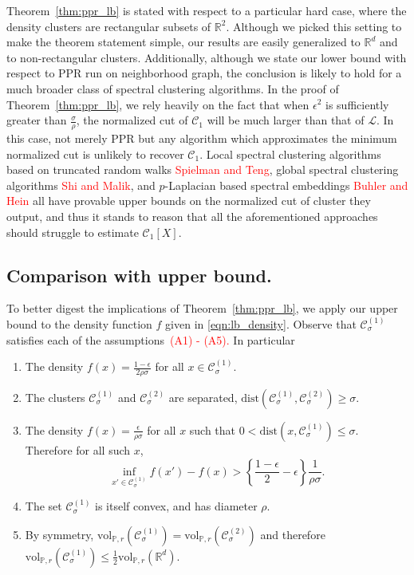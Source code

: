 \documentclass[11pt,twoside]{article}
\newcommand{\vol}{\mathrm{vol}}
\newcommand{\Reals}{\mathbb{R}}
\newcommand{\1}{\mathbf{1}}
\newcommand{\dist}{\mathrm{dist}}
\newcommand{\Xbf}{X}             %
\newcommand{\Pbb}{\mathbb{P}}
\newcommand{\Cset}{\mathcal{C}}
\newcommand{\Csig}{\Cset_{\sigma}}
\begin{document}
Theorem~\ref{thm:ppr_lb} is stated with respect to a particular hard case, where the density clusters are rectangular subsets of $\Reals^2$. Although we picked this setting to make the theorem statement simple, our results are easily generalized to $\Reals^d$ and to non-rectangular clusters. Additionally, although we state our lower bound with respect to PPR run on neighborhood graph, the conclusion is likely to hold for a much broader class of spectral clustering algorithms. In the proof of Theorem~\ref{thm:ppr_lb}, we rely heavily on the fact that when $\epsilon^2$ is sufficiently greater than $\frac{\sigma}{\rho}$, the normalized cut of $\Cset_1$ will be much larger than that of $\mathcal{L}$. In this case, not merely PPR but any algorithm which approximates the minimum normalized cut is unlikely to recover $\Cset_1$. Local spectral clustering algorithms based on truncated random walks \textcolor{red}{Spielman and Teng}, global spectral clustering algorithms \textcolor{red}{Shi and Malik}, and $p$-Laplacian based spectral embeddings \textcolor{red}{Buhler and Hein} all have provable upper bounds on the normalized cut of cluster they output, and thus it stands to reason that all the aforementioned approaches should struggle to estimate $\Cset_1[\Xbf]$.

\subsection{Comparison with upper bound.}

To better digest the implications of Theorem~\ref{thm:ppr_lb}, we apply our upper bound to the density function $f$ given in \eqref{eqn:lb_density}. Observe that $\Csig^{(1)}$ satisfies each of the assumptions~\textcolor{red}{(A1) - (A5).} In particular
\begin{enumerate}[label=(A\arabic*)]
	\item The density $f(x) = \frac{1 - \epsilon}{2 \rho \sigma}$ for all $x \in \Csig^{(1)}$.
	\item The clusters $\Csig^{(1)}$ and $\Csig^{(2)}$ are separated, $\dist(\Csig^{(1)}, \Csig^{(2)}) \geq \sigma$. 
	\item The density $f(x) = \frac{\epsilon}{\rho\sigma}$ for all $x$ such that $0 < \dist(x,\Csig^{(1)}) \leq \sigma$. Therefore for all such $x$,
	\begin{equation*}
	\inf_{x' \in \Csig^{(1)}} f(x') - f(x)  > \left\{\frac{1 - \epsilon}{2} - \epsilon \right\} \frac{1}{\rho \sigma}.
	\end{equation*}
	\item The set $\Csig^{(1)}$ is itself convex, and has diameter $\rho$.
	\item By symmetry, $\vol_{\Pbb,r}(\Csig^{(1)}) = \vol_{\Pbb,r}(\Csig^{(2)})$ and therefore $\vol_{\Pbb,r}(\Csig^{(1)}) \leq \frac{1}{2}\vol_{\Pbb,r}(\Reals^d)$. 
\end{enumerate}
\end{document}
